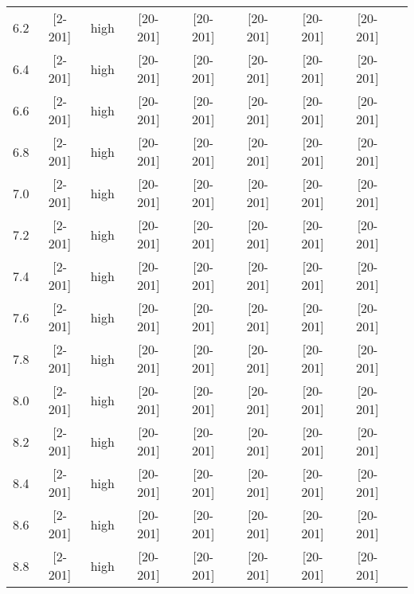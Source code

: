 \documentclass{article}
\begin{document}
\begin{tabular}{| c | c | c | c | c | c | c | c | c |}
      6.2 & [2-201] & high & [20-201] & [20-201] & [20-201] & [20-201] & [20-201] &\\
      6.4 & [2-201] & high & [20-201] & [20-201] & [20-201] & [20-201] & [20-201] &\\
      6.6 & [2-201] & high & [20-201] & [20-201] & [20-201] & [20-201] & [20-201] &\\
      6.8 & [2-201] & high & [20-201] & [20-201] & [20-201] & [20-201] & [20-201] &\\
      7.0 & [2-201] & high & [20-201] & [20-201] & [20-201] & [20-201] & [20-201] &\\
      7.2 & [2-201] & high & [20-201] & [20-201] & [20-201] & [20-201] & [20-201] &\\
      7.4 & [2-201] & high & [20-201] & [20-201] & [20-201] & [20-201] & [20-201] &\\
      7.6 & [2-201] & high & [20-201] & [20-201] & [20-201] & [20-201] & [20-201] &\\
      7.8 & [2-201] & high & [20-201] & [20-201] & [20-201] & [20-201] & [20-201] &\\
      8.0 & [2-201] & high & [20-201] & [20-201] & [20-201] & [20-201] & [20-201] &\\
      8.2 & [2-201] & high & [20-201] & [20-201] & [20-201] & [20-201] & [20-201] &\\
      8.4 & [2-201] & high & [20-201] & [20-201] & [20-201] & [20-201] & [20-201] &\\
      8.6 & [2-201] & high & [20-201] & [20-201] & [20-201] & [20-201] & [20-201] &\\
      8.8 & [2-201] & high & [20-201] & [20-201] & [20-201] & [20-201] & [20-201] &\\
      \hline
    \end{tabular}
\end{document}
